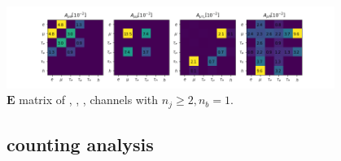 \begin{frame}{}
    \vspace{0.03\textheight}
    \begin{center}
        \includegraphics[width=0.8\textwidth,trim=3cm 0 3cm 0, clip]{chapters/Analysis/sectionStatisticalAnalysis/figures/acc_mu1b.png} \\
       \footnotesize{ $\boldsymbol{E}$ matrix of \cme, \cmm, \cmt, \cmh channels with $n_j\geq2, n_b=1$.}
    \end{center}



\end{frame}







\subsection{counting analysis}

